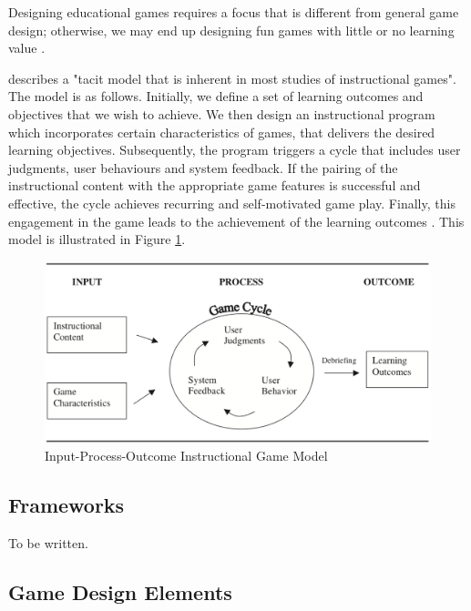 \documentclass[a4paper,11.5pt]{report}
\numberwithin{figure}{section}
\numberwithin{table}{section}
\numberwithin{equation}{section}
\numberwithin{equation}{section}
\begin{document}
Designing educational games requires a focus that is different from general game design; otherwise, we may end up designing fun games with little or no learning value \cite{Barnes2007}.

\citeauthor{Driskell2002} describes a "tacit model that is inherent in most studies of instructional games". The model is as follows. Initially, we define a set of learning outcomes and objectives that we wish to achieve. We then design an instructional program which incorporates certain characteristics of games, that delivers the desired learning objectives. Subsequently, the program triggers a cycle that includes user judgments, user behaviours and system feedback. If the pairing of the instructional content with the appropriate game features is successful and effective, the cycle achieves recurring and self-motivated game play. Finally, this engagement in the game leads to the achievement of the learning outcomes \cite{Driskell2002}. This model is illustrated in Figure \ref{fig:Input_process_outcome_game_model}.

\begin{figure}[H]
 \centering
    \includegraphics[width=1\textwidth]{Input_process_outcome_game_model}
       \captionsetup{justification=centering}
\caption{Input-Process-Outcome Instructional Game Model  {\cite{Driskell2002}}}
\label{fig:Input_process_outcome_game_model}
\end{figure}

\subsection{Frameworks}

To be written.

\subsection{Game Design Elements}
\end{document}
